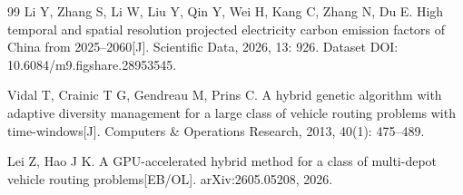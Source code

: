 \documentclass{setp-new}
\begin{document}
\begin{thebibliography}{99}
 Li Y, Zhang S, Li W, Liu Y, Qin Y, Wei H, Kang C, Zhang N, Du E. High temporal and spatial resolution projected electricity carbon emission factors of China from 2025--2060[J]. Scientific Data, 2026, 13: 926. Dataset DOI: 10.6084/m9.figshare.28953545.

 Vidal T, Crainic T G, Gendreau M, Prins C. A hybrid genetic algorithm with adaptive diversity management for a large class of vehicle routing problems with time-windows[J]. Computers \& Operations Research, 2013, 40(1): 475--489.

 Lei Z, Hao J K. A GPU-accelerated hybrid method for a class of multi-depot vehicle routing problems[EB/OL]. arXiv:2605.05208, 2026.

\end{thebibliography}
\end{document}
